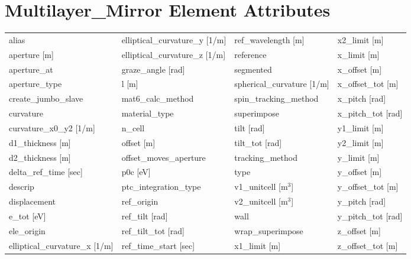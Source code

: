  \section{Multilayer_Mirror Element Attributes}
 \label{s:list.multilayer.mirror}
 
 \begin{tabular}{llll} \toprule
alias                            & elliptical_curvature_y [1/m]     & ref_wavelength [m]               & x2_limit [m]                     \\
aperture [m]                     & elliptical_curvature_z [1/m]     & reference                        & x_limit [m]                      \\
aperture_at                      & graze_angle [rad]                & segmented                        & x_offset [m]                     \\
aperture_type                    & l [m]                            & spherical_curvature [1/m]        & x_offset_tot [m]                 \\
create_jumbo_slave               & mat6_calc_method                 & spin_tracking_method             & x_pitch [rad]                    \\
curvature                        & material_type                    & superimpose                      & x_pitch_tot [rad]                \\
curvature_x0_y2 [1/m]            & n_cell                           & tilt [rad]                       & y1_limit [m]                     \\
d1_thickness [m]                 & offset [m]                       & tilt_tot [rad]                   & y2_limit [m]                     \\
d2_thickness [m]                 & offset_moves_aperture            & tracking_method                  & y_limit [m]                      \\
delta_ref_time [sec]             & p0c [eV]                         & type                             & y_offset [m]                     \\
descrip                          & ptc_integration_type             & v1_unitcell [m$^3$]              & y_offset_tot [m]                 \\
displacement                     & ref_origin                       & v2_unitcell [m$^3$]              & y_pitch [rad]                    \\
e_tot [eV]                       & ref_tilt [rad]                   & wall                             & y_pitch_tot [rad]                \\
ele_origin                       & ref_tilt_tot [rad]               & wrap_superimpose                 & z_offset [m]                     \\
elliptical_curvature_x [1/m]     & ref_time_start [sec]             & x1_limit [m]                     & z_offset_tot [m]                 \\
 \bottomrule
 \end{tabular}
 \vfill
 
